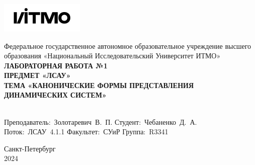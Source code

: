 \documentclass[a4paper, 12pt]{article}
\begin{document}
    \begin{titlepage}
        \begin{center}
            \includegraphics[width=0.3\textwidth]{itmo.png}
        \vfill

        Федеральное государственное автономное образовательное учреждение высшего образования
        «Национальный Исследовательский Университет ИТМО»\\

        \vfill
        {\large\bf ЛАБОРАТОРНАЯ РАБОТА №1}\\
        {\large\bf ПРЕДМЕТ «ЛСАУ»}\\
        {\large\bf ТЕМА «КАНОНИЧЕСКИЕ ФОРМЫ ПРЕДСТАВЛЕНИЯ
        ДИНАМИЧЕСКИХ СИСТЕМ»}\\
        {\large{}}\\
        \vfill

        \begin{flushright}
            \begin{minipage}{.45\textwidth}
            {
                \hbox{Преподаватель: Золотаревич В. П.}
                \hbox{Студент: Чебаненко Д. А.}
                \hbox{Поток: ЛСАУ 4.1.1}
                \hbox{}
                \hbox{Факультет: СУиР}
                \hbox{Группа: R3341}
            }
            \end{minipage}
        \end{flushright}

        \vfill

        Санкт-Петербург\\
        2024
        \end{center}
    \end{titlepage}

    \tableofcontents

    \newpage
\end{document}
